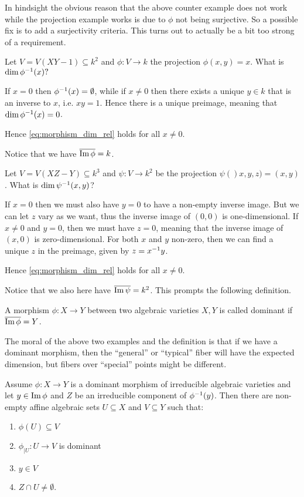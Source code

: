 In hindsight the obvious reason that the above counter example does not work while the projection example works is due to $\phi$ not being surjective. So a possible fix is to add a surjectivity criteria. This turns out to actually be a bit too strong of a requirement. 

\begin{example}
Let $V=V(XY-1)\subseteq k^2$ and $\phi\colon V\longrightarrow k$ the projection $\phi(x, y) = x$. What is $\dim \phi^{-1} (x)?$

If $x=0$ then $\phi^{-1}(x) = \emptyset$, while if $x\neq 0$ then there exists a unique $y\in k$ that is an inverse to $x$, i.e. $xy = 1$. Hence there is a unique preimage, meaning that $\dim\phi^{-1}(x) =0$. 

Hence \cref{eq:morphism_dim_rel} holds for all $x\neq 0$. 
\end{example}

Notice that we have $\overline{\operatorname{Im}\phi} = k$. 

\begin{example}
Let $V=V(XZ-Y)\subseteq k^3$ and $\psi\colon V\longrightarrow k^2$ be the projection $\psi()x, y, z)=(x, y)$. What is $\dim\psi^{-1}(x, y)$?

If $x=0$ then we must also have $y=0$ to have a non-empty inverse image. But we can let $z$ vary as we want, thus the inverse image of $(0,0)$ is one-dimensional. If $x\neq 0$ and $y = 0$, then we must have $z=0$, meaning that the inverse image of $(x, 0)$ is zero-dimensional. For both $x$ and $y$ non-zero, then we can find a unique $z$ in the preimage, given by $z = x^{-1} y$.

Hence \cref{eq:morphism_dim_rel} holds for all $x\neq 0$.
\end{example}

Notice that we also here have $\overline{\operatorname{Im}\psi} = k^2$. This prompts the following definition. 

\begin{definition}
A morphism $\phi\colon X\longrightarrow Y$ between two algebraic varieties $X, Y$ is called dominant if $\overline{\operatorname{Im}\phi} = Y$. 
\end{definition}

The moral of the above two examples and the definition is that if we have a dominant morphism, then the ``general'' or ``typical'' fiber will have the expected dimension, but fibers over ``special'' points might be different. 

\begin{lemma}
Assume $\phi\colon X\longrightarrow Y$ is a dominant morphism of irreducible algebraic varieties and let $y\in \operatorname{Im}\phi$ and $Z$ be an irreducible component of $\phi^{-1}(y)$. Then there are non-empty affine algebraic sets $U\subseteq X$ and $V\subseteq Y$ such that:
\begin{enumerate}
    \item $\phi(U)\subseteq V$
    \item $\phi_{|U}\colon U\longrightarrow V$ is dominant
    \item $y\in V$
    \item $Z\cap U \neq \emptyset$.
\end{enumerate}
\end{lemma}

